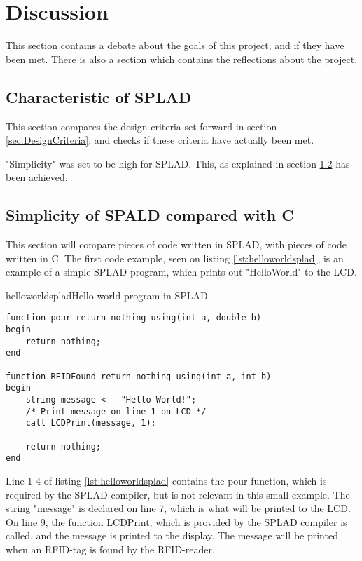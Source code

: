 \section{Discussion}
\label{sec:discussion}
This section contains a debate about the goals of this project, and if they have been met. There is also a section which contains the reflections about the project.

\subsection{Characteristic of SPLAD}
This section compares the design criteria set forward in section \ref{sec:DesignCriteria}, and checks if these criteria have actually been met.

"Simplicity" was set to be high for SPLAD. This, as explained in section \ref{sec:simplespladc} has been achieved. 

\subsection{Simplicity of SPALD compared with C}
\label{sec:simplespladc}
This section will compare pieces of code written in SPLAD, with pieces of code written in C. The first code example, seen on listing \ref{lst:helloworldsplad}, is an example of a simple SPLAD program, which prints out "HelloWorld" to the LCD.

\begin{code}{helloworldsplad}{Hello world program in SPLAD}
\begin{lstlisting}
function pour return nothing using(int a, double b)
begin
	return nothing;
end

function RFIDFound return nothing using(int a, int b)
begin
	string message <-- "Hello World!";
	/* Print message on line 1 on LCD */
	call LCDPrint(message, 1);

	return nothing;
end
\end{lstlisting}
\end{code}

Line 1-4 of listing \ref{lst:helloworldsplad} contains the pour function, which is required by the SPLAD compiler, but is not relevant in this small example. The string "message" is declared on line 7, which is what will be printed to the LCD. On line 9, the function LCDPrint, which is provided by the SPLAD compiler is called, and the message is printed to the display. The message will be printed when an RFID-tag is found by the RFID-reader.

